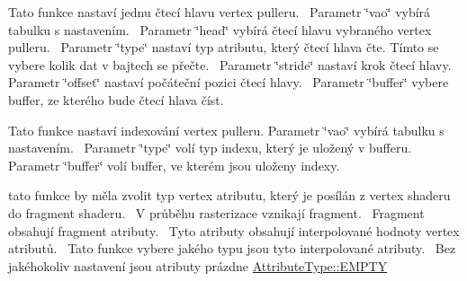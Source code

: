 \begin{DoxyRefList}
\item[\label{todo__todo000010}%
\Hypertarget{todo__todo000010}%
Global \hyperlink{group__vertexpuller__tasks_gae9ffbcfa3b43ac9b3ea53e5bc44f83cc}{G\+PU\+:\+:set\+Vertex\+Puller\+Head} (Vertex\+Puller\+ID vao, uint32\+\_\+t head, Attribute\+Type type, uint64\+\_\+t stride, uint64\+\_\+t offset, Buffer\+ID buffer)]Tato funkce nastaví jednu čtecí hlavu vertex pulleru.~\newline
 Parametr \char`\"{}vao\char`\"{} vybírá tabulku s nastavením.~\newline
 Parametr \char`\"{}head\char`\"{} vybírá čtecí hlavu vybraného vertex pulleru.~\newline
 Parametr \char`\"{}type\char`\"{} nastaví typ atributu, který čtecí hlava čte. Tímto se vybere kolik dat v bajtech se přečte.~\newline
 Parametr \char`\"{}stride\char`\"{} nastaví krok čtecí hlavy.~\newline
 Parametr \char`\"{}offset\char`\"{} nastaví počáteční pozici čtecí hlavy.~\newline
 Parametr \char`\"{}buffer\char`\"{} vybere buffer, ze kterého bude čtecí hlava číst.~\newline
  
\item[\label{todo__todo000011}%
\Hypertarget{todo__todo000011}%
Global \hyperlink{group__vertexpuller__tasks_gae5238dbc60eb2ece94df110945a4f46b}{G\+PU\+:\+:set\+Vertex\+Puller\+Indexing} (Vertex\+Puller\+ID vao, Index\+Type type, Buffer\+ID buffer)]Tato funkce nastaví indexování vertex pulleru. Parametr \char`\"{}vao\char`\"{} vybírá tabulku s nastavením.~\newline
 Parametr \char`\"{}type\char`\"{} volí typ indexu, který je uložený v bufferu.~\newline
 Parametr \char`\"{}buffer\char`\"{} volí buffer, ve kterém jsou uloženy indexy.~\newline
  
\item[\label{todo__todo000020}%
\Hypertarget{todo__todo000020}%
Global \hyperlink{group__program__tasks_gaff499d4f692ea0dd7125bfd324957619}{G\+PU\+:\+:set\+V\+S2\+F\+S\+Type} (Program\+ID prg, uint32\+\_\+t attrib, Attribute\+Type type)]tato funkce by měla zvolit typ vertex atributu, který je posílán z vertex shaderu do fragment shaderu.~\newline
 V průběhu rasterizace vznikají fragment.~\newline
 Fragment obsahují fragment atributy.~\newline
 Tyto atributy obsahují interpolované hodnoty vertex atributů.~\newline
 Tato funkce vybere jakého typu jsou tyto interpolované atributy.~\newline
 Bez jakéhokoliv nastavení jsou atributy prázdne \hyperlink{fwd_8hpp_a349a9cde14be8097df865ba0469c0ab2aba2b45bdc11e2a4a6e86aab2ac693cbb}{Attribute\+Type\+::\+E\+M\+P\+TY}~\newline
  

\end{DoxyRefList}
